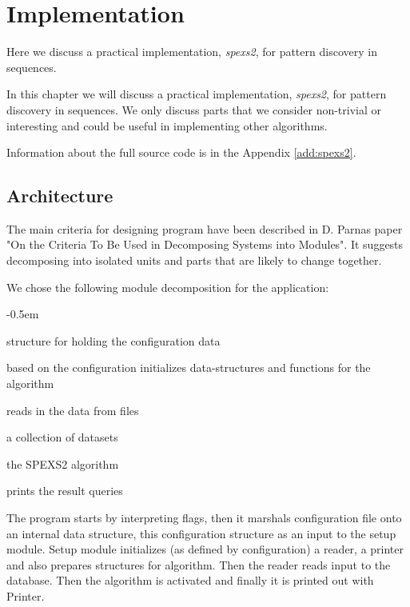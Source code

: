 \chapter{Implementation}
\label{c:implementation}

Here we discuss a practical implementation, \emph{spexs2}, for
pattern discovery in sequences. 

In this chapter we will discuss a practical implementation, \emph{spexs2}, for pattern discovery in sequences. We only discuss parts that we consider non-trivial or interesting and could be useful in implementing other algorithms.

Information about the full source code is in the Appendix \ref{add:spexs2}.

\section{Architecture}

The main criteria for designing program have been described in D. Parnas
paper "On the Criteria To Be Used in Decomposing Systems into Modules"\cite{Parnas72}. It suggests decomposing into isolated units and parts that are likely to change together.

We chose the following module decomposition for the application:

\begin{small}
\begin{description}
    \itemsep-0.5em
    \item[Configuration] structure for holding the configuration data
    \item[Setup] based on the configuration initializes data-structures and functions for the algorithm
    \item[Reader] reads in the data from files
    \item[Database] a collection of datasets
    \item[Algorithm] the SPEXS2 algorithm
    \item[Printer] prints the result queries
\end{description}
\end{small}

The program starts by interpreting flags, then it marshals configuration file onto an internal data structure, this configuration structure as an input to the setup module. Setup module initializes (as defined by configuration) a reader, a printer and also prepares structures for algorithm. Then the reader reads input to the database. Then the algorithm is activated and finally it is printed out with Printer.

